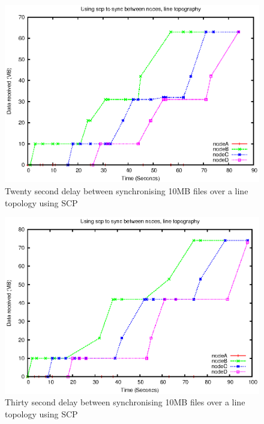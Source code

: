 \documentclass[12pt]{article}
\begin{document}
\begin{figure}[hb!]
\centering
\includegraphics[height=0.4\textheight]{images/line-scp-10-20.eps}
\caption{Twenty second delay between synchronising 10MB files over a line topology
using SCP}
\label{fig:line_scp_10_20}
\end{figure}
\newpage

\begin{figure}[ht!]
\centering
\includegraphics[height=0.4\textheight]{images/line-scp-10-30.eps}
\caption{Thirty second delay between synchronising 10MB files over a line topology
using SCP}
\label{fig:line_scp_10_30}
\end{figure}
\newpage
\end{document}
